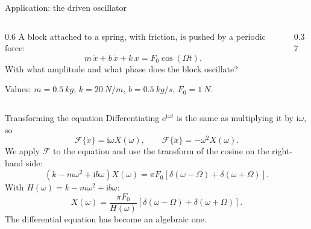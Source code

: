 \documentclass[11pt,aspectratio=169]{beamer}
\newcommand{\F}{\mathcal{F}}
\newcommand{\ii}{\mathrm{i}}
\newcommand{\e}{\mathrm{e}}
\begin{document}
\begin{frame}{Application: the driven oscillator}
  \begin{columns}[c]
    \begin{column}{0.6\textwidth}
      A block attached to a spring, with friction, is pushed by a periodic force:
      \[
        m\,\ddot x+b\,\dot x+k\,x=F_0\cos(\Omega t).
      \]
      With what amplitude and what phase does the block oscillate?

      \vspace{3mm}
      Values: $m=\SI{0.5}{kg}$, $k=\SI{20}{N/m}$, $b=\SI{0.5}{kg/s}$, $F_0=\SI{1}{N}$.
    \end{column}
    \begin{column}{0.37\textwidth}
      \centering
    \end{column}
  \end{columns}
\end{frame}

\begin{frame}{Transforming the equation}
  Differentiating $\e^{\ii\omega t}$ is the same as multiplying it by $\ii\omega$, so
  \[
    \F\{\dot x\}=\ii\omega X(\omega),\qquad \F\{\ddot x\}=-\omega^2X(\omega).
  \]
  We apply $\F$ to the equation and use the transform of the cosine on the right-hand side:
  \[
    \left(k-m\omega^2+\ii b\omega\right)X(\omega)
    =\pi F_0\left[\delta(\omega-\Omega)+\delta(\omega+\Omega)\right].
  \]
  With $H(\omega)=k-m\omega^2+\ii b\omega$:
  \[
    X(\omega)=\frac{\pi F_0}{H(\omega)}\left[\delta(\omega-\Omega)+\delta(\omega+\Omega)\right].
  \]
  The differential equation has become an algebraic one.
\end{frame}
\end{document}
